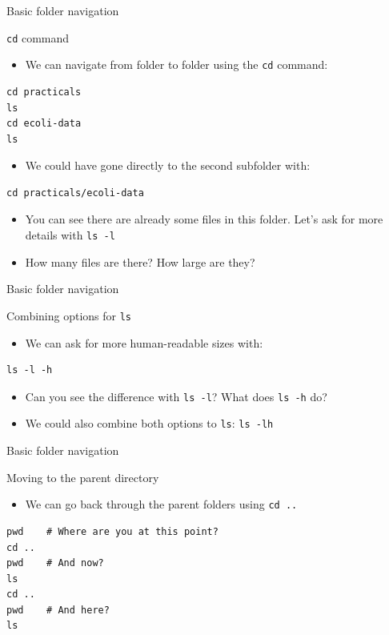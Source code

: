 \documentclass[big]{beamer}
\begin{document}
\begin{frame}[fragile,label=sec-2-15]{Basic folder navigation}
 \begin{block}{\texttt{cd} command}
\begin{itemize}
\item We can navigate from folder to folder using the \texttt{cd} command:
\end{itemize}
\begin{verbatim}
cd practicals
ls
cd ecoli-data
ls
\end{verbatim}
\begin{itemize}
\item We could have gone directly to the second subfolder with:
\end{itemize}
\begin{verbatim}
cd practicals/ecoli-data
\end{verbatim}

\begin{itemize}
\item You can see there are already some files in this folder. Let's ask for more
details with \texttt{ls -l}

\item How many files are there? How large are they?
\end{itemize}
\end{block}
\end{frame}
\begin{frame}[fragile,label=sec-2-16]{Basic folder navigation}
 \begin{block}{Combining options for \texttt{ls}}
\begin{itemize}
\item We can ask for more human-readable sizes with:
\end{itemize}
\begin{verbatim}
ls -l -h
\end{verbatim}
\begin{itemize}
\item Can you see the difference with \texttt{ls -l}? What does \texttt{ls -h} do?
\item We could also combine both options to \texttt{ls}: \texttt{ls -lh}
\end{itemize}
\end{block}
\end{frame}
\begin{frame}[fragile,label=sec-2-17]{Basic folder navigation}
 \begin{block}{Moving to the parent directory}
\begin{itemize}
\item We can go back through the parent folders using \texttt{cd ..}
\end{itemize}
\begin{verbatim}
pwd    # Where are you at this point?
cd ..
pwd    # And now?
ls
cd ..
pwd    # And here?
ls
\end{verbatim}
\end{block}
\end{frame}
\end{document}
